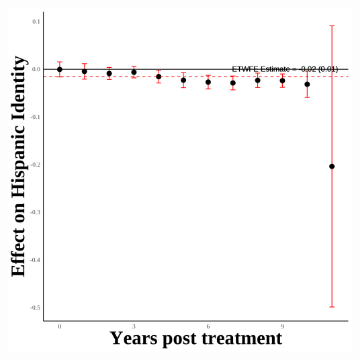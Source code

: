 \documentclass[12pt,english]{article}
\begin{document}
\begin{figure}[H]
\begin{subfigure}[b]{0.45\textwidth}
    \includegraphics[width=\linewidth]{figures/secondgen-hh-hispanic_event_study.png}
    \label{fig:second-gen-hh}
  \end{subfigure}

  \vspace{0.3cm} %


\end{figure}
\end{document}
